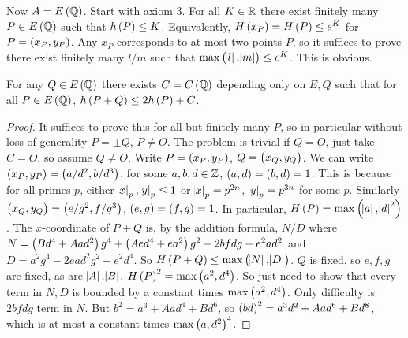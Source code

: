 Now $ A = E\br{\Q} $. Start with axiom $ 3 $. For all $ K \in \mathbb{R} $ there exist finitely many $ P \in E\br{\Q} $ such that $ h\br{P} \le K $. Equivalently, $ H\br{x_P} = H\br{P} \le e^K $ for $ P = \br{x_P, y_P} $. Any $ x_P $ corresponds to at most two points $ P $, so it suffices to prove there exist finitely many $ l / m $ such that $ \max\br{\abs{l}, \abs{m}} \le e^K $. This is obvious.

\begin{lemma}
For any $ Q \in E\br{\Q} $ there exists $ C = C\br{\Q} $ depending only on $ E, Q $ such that for all $ P \in E\br{\Q} $, $ h\br{P + Q} \le 2h\br{P} + C $.
\end{lemma}

\pagebreak

\begin{proof}
It suffices to prove this for all but finitely many $ P $, so in particular without loss of generality $ P = \pm Q $, $ P \ne O $. The problem is trivial if $ Q = O $, just take $ C = O $, so assume $ Q \ne O $. Write $ P = \br{x_P, y_P} $, $ Q = \br{x_Q, y_Q} $. We can write $ \br{x_P, y_P} = \br{a / d^2, b / d^3} $, for some $ a, b, d \in \mathbb{Z} $, $ \br{a, d} = \br{b, d} = 1 $. This is because for all primes $ p $, either $ \abs{x}_p, \abs{y}_p \le 1 $ or $ \abs{x}_p = p^{2n} $, $ \abs{y}_p = p^{3n} $ for some $ p $. Similarly $ \br{x_Q, y_Q} = \br{e / g^2, f / g^3} $, $ \br{e, g} = \br{f, g} = 1 $. In particular, $ H\br{P} = \max\br{\abs{a}, \abs{d}^2} $. The $ x $-coordinate of $ P + Q $ is, by the addition formula, $ N / D $ where $ N = \br{Bd^4 + Aad^2}g^4 + \br{Aed^4 + ea^2}g^2 - 2bfdg + e^2ad^2 $ and $ D = a^2g^4 - 2ead^2g^2 + e^2d^4 $. So $ H\br{P + Q} \le \max\br{\abs{N}, \abs{D}} $. $ Q $ is fixed, so $ e, f, g $ are fixed, as are $ \abs{A}, \abs{B} $. $ H\br{P}^2 = \max\br{a^2, d^4} $. So just need to show that every term in $ N, D $ is bounded by a constant times $ \max\br{a^2, d^4} $. Only difficulty is $ 2bfdg $ term in $ N $. But $ b^2 = a^3 + Aad^4 + Bd^6 $, so $ \br{bd}^2 = a^3d^2 + Aad^6 + Bd^8 $, which is at most a constant times $ \max\br{a, d^2}^4 $.
\end{proof}


